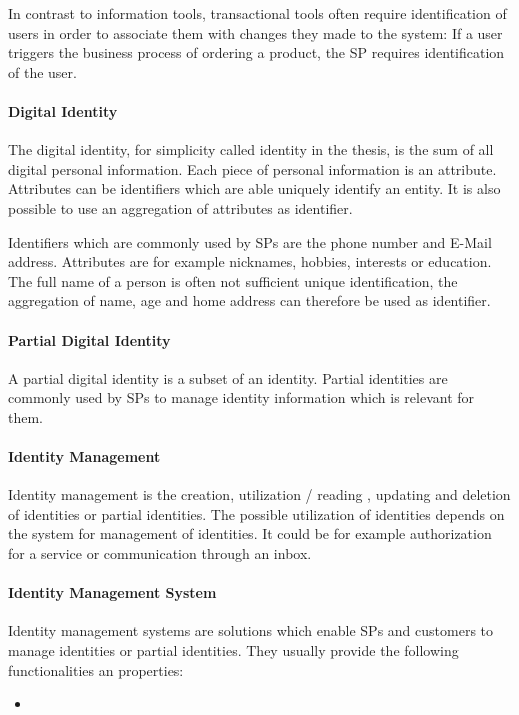 \documentclass[
     12pt,         %
     a4paper,      %
     BCOR=10mm,version=first,     %
     DIV=14,version=first,        %
     ]{scrreprt}
\begin{document}
In contrast to information tools, transactional tools often require identification of users in order to associate them with changes they made to the system: If a user triggers the business process of ordering a product, the SP requires identification of the user.

\paragraph{Digital Identity}
The digital identity, for simplicity called identity in the thesis, is the sum of all digital personal information. Each piece of personal information is an attribute. Attributes can be identifiers which are able uniquely identify an entity. It is also possible to use an aggregation of attributes as identifier.

Identifiers which are commonly used by SPs are the phone number and E-Mail address. Attributes are for example nicknames, hobbies, interests or education. The full name of a person is often not sufficient unique identification, the aggregation of name, age and home address can therefore be used as identifier.

\paragraph{Partial Digital Identity}
A partial digital identity is a subset of an identity. Partial identities are commonly used by SPs to manage identity information which is relevant for them. 

\paragraph{Identity Management}
Identity management is the creation, utilization / reading , updating and deletion of identities or partial identities. The possible utilization of identities depends on the system for management of identities. It could be for example authorization for a service or communication through an inbox.

\paragraph{Identity Management System}
Identity management systems are solutions which enable SPs and customers to manage identities or partial identities.
They usually provide the following functionalities an properties:
\begin{itemize}
    \item 
\end{itemize}
\end{document}
